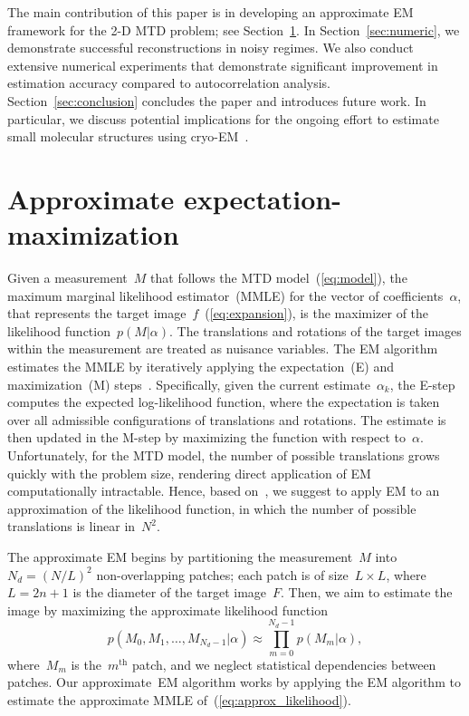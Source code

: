 \documentclass{article}
\begin{document}
The main contribution of this paper is in developing an approximate EM framework for the 2-D MTD problem; see Section~\ref{sec:EM}. In Section~\ref{sec:numeric}, we demonstrate successful reconstructions in noisy regimes.
We also conduct extensive numerical experiments that  demonstrate significant improvement in estimation accuracy compared to autocorrelation analysis.
 Section~\ref{sec:conclusion} concludes the paper and introduces  future work.
In particular, we discuss potential implications for the ongoing effort
to estimate small molecular structures using cryo-EM~\cite{bendory2018toward}.

\section{Approximate expectation-maximization}
\label{sec:EM}
Given a measurement~$M$ that follows the MTD model~(\ref{eq:model}), the maximum marginal likelihood estimator~(MMLE) for the vector of coefficients~$\alpha$, that represents the target image~$f$~(\ref{eq:expansion}), is the maximizer of the likelihood function~$p(M | \alpha)$. The translations and rotations of the target images within the measurement are treated as nuisance variables. The EM algorithm estimates the MMLE by iteratively applying the expectation~(E) and maximization~(M) steps~\cite{dempster1977maximum}. Specifically, given the current estimate~$\alpha_k$, the \mbox{E-step} computes the expected log-likelihood function, where the expectation is taken over all admissible configurations of translations and rotations. The estimate is then updated in the \mbox{M-step} by maximizing the function with respect to~$\alpha$. Unfortunately, for the MTD model, the number of possible translations grows quickly with the problem size, rendering direct application of EM computationally intractable. Hence, based on~\cite{lan2020multi}, we suggest to apply EM to an approximation of the likelihood function, in which the number of possible translations is linear in~$N^2$.

The approximate EM begins by partitioning the measurement~$M$ into~$N_d = (N / L)^2$ \mbox{non-overlapping} patches; each patch is of size~\mbox{$L \times L$}, where~\mbox{$L = 2n + 1$} is the diameter of the target image~$F$. Then, we aim to estimate the image by maximizing the approximate likelihood function
\begin{equation}
\label{eq:approx_likelihood}
p(M_0, M_1, \ldots, M_{N_d-1}|\alpha) \approx \prod_{m = 0}^{N_d - 1} p(M_m|\alpha),
\end{equation}
where~$M_m$ is the~$m^{\text{th}}$ patch, and we neglect statistical dependencies between patches. Our approximate~EM algorithm works by applying the EM algorithm to estimate the approximate MMLE of~(\ref{eq:approx_likelihood}).
\end{document}
